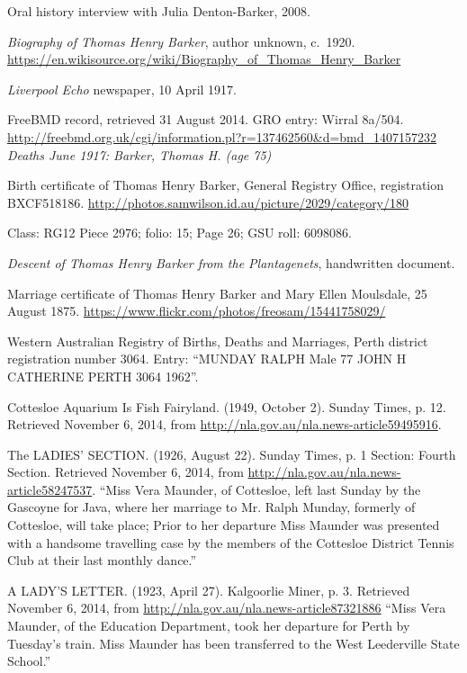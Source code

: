 \begin{thebibliography}{99}
	Oral history interview with Julia Denton-Barker, 2008.

	\emph{Biography of Thomas Henry Barker}, author unknown, c.\ 1920.
	\url{https://en.wikisource.org/wiki/Biography_of_Thomas_Henry_Barker}

	\emph{Liverpool Echo} newspaper, 10 April 1917.

	FreeBMD record, retrieved 31 August 2014. GRO entry: Wirral 8a/504.
	\url{http://freebmd.org.uk/cgi/information.pl?r=137462560&d=bmd_1407157232}
	\emph{Deaths June 1917: Barker, Thomas H. (age 75)}

	Birth certificate of Thomas Henry Barker, General Registry Office, registration BXCF518186.
	\url{http://photos.samwilson.id.au/picture/2029/category/180}

	Class: RG12 Piece 2976; folio: 15; Page 26; GSU roll: 6098086.

	\emph{Descent of Thomas Henry Barker from the Plantagenets},
	handwritten document.

	Marriage certificate of Thomas Henry Barker and Mary Ellen Moulsdale, 25 August 1875.
	\url{https://www.flickr.com/photos/freosam/15441758029/}

	 Western Australian Registry of Births, Deaths and Marriages, Perth district registration number 3064.
	 Entry: ``MUNDAY RALPH 	Male 	77 	JOHN H 	CATHERINE 		PERTH 	3064 	1962''.

    Cottesloe Aquarium Is Fish Fairyland.
    (1949, October 2). Sunday Times, p. 12. Retrieved November 6, 2014,
    from \url{http://nla.gov.au/nla.news-article59495916}.

	The LADIES' SECTION. (1926, August 22). Sunday Times, p. 1 Section: Fourth Section.
	Retrieved November 6, 2014, from \url{http://nla.gov.au/nla.news-article58247537}.
	``Miss Vera Maunder, of Cottesloe, left last Sunday by the Gascoyne for Java, where her marriage to Mr. Ralph Munday, formerly of Cottesloe, will take place; Prior to her departure Miss Maunder was presented with a handsome travelling case by the members of the Cottesloe District Tennis Club at their last monthly dance.''

	A LADY'S LETTER. (1923, April 27). Kalgoorlie Miner, p. 3.
	Retrieved November 6, 2014, from \url{http://nla.gov.au/nla.news-article87321886}
	``Miss Vera Maunder, of the Education Department, took her departure for Perth by Tuesday's train.
	Miss Maunder has been transferred to the West Leederville State School.''


\end{thebibliography}
